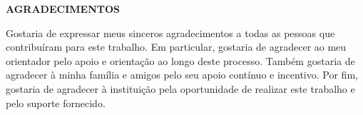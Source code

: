 \begin{center}
    \textbf{AGRADECIMENTOS}
 \end{center}
 
 \hspace{2cm}
 
 \begin{center}
     
    Gostaria de expressar meus sinceros agradecimentos a todas as pessoas que contribuíram para este trabalho. Em particular, gostaria de agradecer ao meu orientador pelo apoio e orientação ao longo deste processo. Também gostaria de agradecer à minha família e amigos pelo seu apoio contínuo e incentivo. Por fim, gostaria de agradecer à instituição pela oportunidade de realizar este trabalho e pelo suporte fornecido. 


 \end{center}
 
 \thispagestyle{empty}